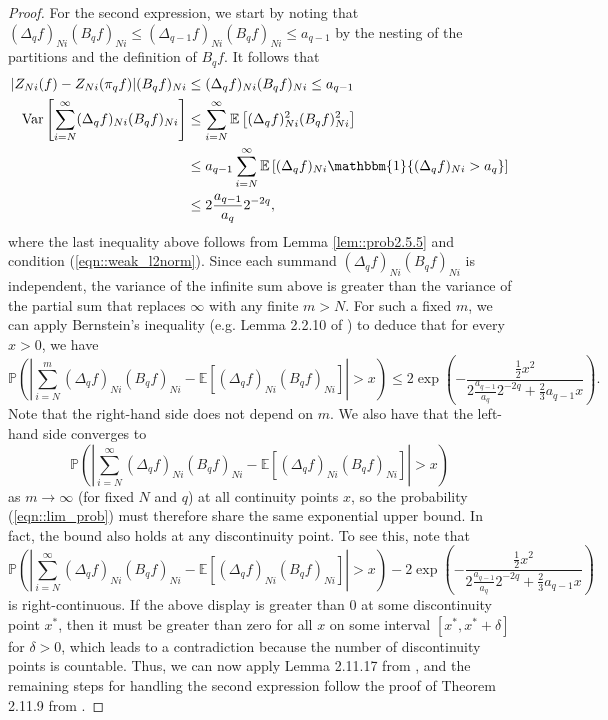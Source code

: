 \documentclass[11pt,a4paper]{article}
\newcommand{\E}{\mathbb{E}}
\renewcommand{\Pr}{\mathbb{P}}
\begin{document}
\begin{appendices}
\begin{proof}
    For the second expression, we start by noting that $(\Delta_{q}f)_{Ni}(B_{q}f)_{Ni} \leq (\Delta_{q-1}f)_{Ni}(B_{q}f)_{Ni} \leq a_{q-1}$ by the nesting of the partitions and the definition of $B_{q}f$. It follows that
    \begin{align*}
        |Z_{Ni}(f) - Z_{Ni}(\pi_{q}f)|(B_{q}f)_{Ni} &\leq (\Delta_{q}f)_{Ni}(B_{q}f)_{Ni}  \leq a_{q-1}\\
        \text{Var}\left[\sum_{i=N}^{\infty}(\Delta_{q}f)_{Ni}(B_{q}f)_{Ni}\right] &\leq \sum_{i=N}^{\infty}\E\left[(\Delta_{q}f)^{2}_{Ni}(B_{q}f)^{2}_{Ni}\right]\\
        &\leq a_{q-1}\sum_{i=N}^{\infty}\E\left[(\Delta_{q}f)_{Ni}\mathbbm{1}\{(\Delta_{q}f)_{Ni} > a_{q}\}\right] \\
        &\leq 2 \frac{a_{q-1}}{a_{q}} 2^{-2q},
    \end{align*}
    where the last inequality above follows from {Lemma \ref{lem::prob2.5.5}} and condition (\ref{eqn::weak_l2norm}). Since each summand $(\Delta_{q}f)_{Ni}(B_{q}f)_{Ni}$ is independent, the variance of the infinite sum above is greater than the variance of the partial sum that replaces $\infty$ with any finite $m > N$. For such a fixed $m$, we can apply Bernstein's inequality (e.g. Lemma 2.2.10 of \cite{vanderVaart2023}) to deduce that for every $x > 0$, we have
    \begin{equation*}
        \Pr\left(\left|\sum_{i=N}^{m}(\Delta_{q}f)_{Ni}(B_{q}f)_{Ni} -\E[(\Delta_{q}f)_{Ni}(B_{q}f)_{Ni}]\right| > x\right) \leq 2\exp\left(-\frac{\frac{1}{2}x^{2}}{2 \frac{a_{q-1}}{a_{q}} 2^{-2q}+\frac{2}{3}a_{q-1}x}\right).
    \end{equation*}
    Note that the right-hand side does not depend on $m$. We also have that the left-hand side converges to
    \begin{equation} \label{eqn::lim_prob}
        \Pr\left(\left|\sum_{i=N}^{\infty}(\Delta_{q}f)_{Ni}(B_{q}f)_{Ni} -\E[(\Delta_{q}f)_{Ni}(B_{q}f)_{Ni}]\right| > x\right)
    \end{equation}
    as $m \rightarrow \infty$ (for fixed $N$ and $q$) at all continuity points $x$, so the probability (\ref{eqn::lim_prob}) must therefore share the same exponential upper bound. In fact, the bound also holds at any discontinuity point. To see this, note that
    \begin{equation*}
        \Pr\left(\left|\sum_{i=N}^{\infty}(\Delta_{q}f)_{Ni}(B_{q}f)_{Ni} -\E[(\Delta_{q}f)_{Ni}(B_{q}f)_{Ni}]\right| > x\right) - 2\exp\left(-\frac{\frac{1}{2}x^{2}}{2 \frac{a_{q-1}}{a_{q}} 2^{-2q}+\frac{2}{3}a_{q-1}x}\right)
    \end{equation*}
    is right-continuous. If the above display is greater than 0 at some discontinuity point $x^{*}$, then it must be greater than zero for all $x$ on some interval $[x^{*},x^{*} + \delta]$ for $\delta >0$, which leads to a contradiction because the number of discontinuity points is countable. Thus, we can now apply Lemma 2.11.17 from \cite{vanderVaart2023}, and the remaining steps for handling the second expression follow the proof of Theorem 2.11.9 from \cite{vanderVaart2023}.


\end{proof}
\end{appendices}
\end{document}
